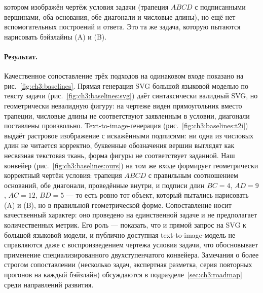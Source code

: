 котором изображён чертёж условия задачи (трапеция \(ABCD\) с подписанными вершинами, оба основания, обе диагонали и числовые длины), но ещё нет вспомогательных построений и ответа. Это та же задача, которую пытаются нарисовать бэйзлайны (A) и (B).

\paragraph{Результат.} Качественное сопоставление трёх подходов на одинаковом входе показано на рис.~\ref{fig:ch3:baselines}. Прямая генерация SVG большой языковой моделью по тексту задачи (рис.~\ref{fig:ch3:baselines:svg}) даёт синтаксически валидный SVG, но геометрически невалидную фигуру: на чертеже виден прямоугольник вместо трапеции, числовые длины не соответствуют заявленным в условии, диагонали поставлены произвольно. Text\nobreakdash-to\nobreakdash-image\nobreakdash-генерация (рис.~\ref{fig:ch3:baselines:t2i}) выдаёт растровое изображение с искажёнными подписями: ни одна из числовых длин не читается корректно, буквенные обозначения вершин выглядят как несвязная текстовая ткань, форма фигуры не соответствует заданной. Наш конвейер (рис.~\ref{fig:ch3:baselines:ours}) на том же входе формирует геометрически корректный чертёж условия: трапеция \(ABCD\) с правильным соотношением оснований, обе диагонали, проведённые внутри, и подписи длин \(BC = 4\), \(AD = 9\), \(AC = 12\), \(BD = 5\) --- то есть ровно тот объект, который пытались нарисовать (A) и (B), но в правильной геометрической форме. Сопоставление носит качественный характер: оно проведено на единственной задаче и не предполагает количественных метрик. Его роль --- показать, что и прямой запрос на SVG к большой языковой модели, и публично доступная text\nobreakdash-to\nobreakdash-image\nobreakdash-модель не справляются даже с воспроизведением чертежа условия задачи, что обосновывает применение специализированного двухступенчатого конвейера. Замечания о более строгом сопоставлении (несколько задач, экспертная разметка, серия повторных прогонов на каждый бэйзлайн) обсуждаются в подразделе~\ref{sec:ch3:roadmap} среди направлений развития.

